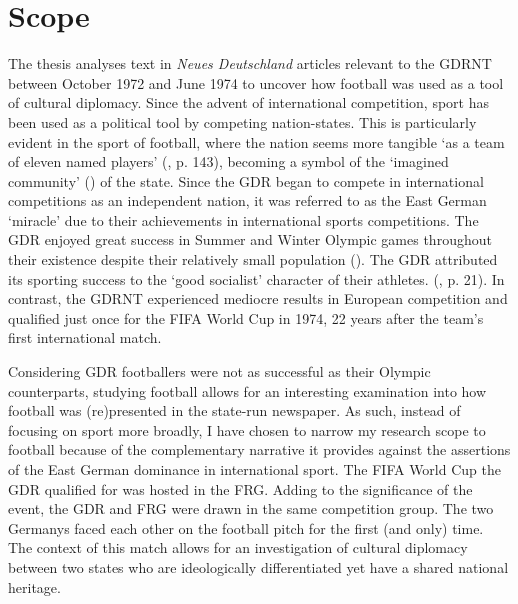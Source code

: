 \section*{Scope}

The thesis analyses text in \textit{Neues Deutschland} articles relevant to the GDRNT between October 1972 and June 1974 to uncover how football was used as a tool of cultural diplomacy. Since the advent of international competition, sport has been used as a political tool by competing nation-states. This is particularly evident in the sport of football, where the nation seems more tangible ‘as a team of eleven named players’ (\cite{hobsawm2012}, p. 143), becoming a symbol of the ‘imagined community’ (\cite{anderson1983}) of the state. Since the GDR began to compete in international competitions as an independent nation, it was referred to as the East German ‘miracle’ due to their achievements in international sports competitions. The GDR enjoyed great success in Summer and Winter Olympic games throughout their existence despite their relatively small population (\cite{dennisgrix2012}). The GDR attributed its sporting success to the ‘good socialist’ character of their athletes. (\cite{dennisgrix2012}, p. 21). In contrast, the GDRNT experienced mediocre results in European competition and qualified just once for the FIFA World Cup in 1974, 22 years after the team’s first international match.

Considering GDR footballers were not as successful as their Olympic counterparts, studying football allows for an interesting examination into how football was (re)presented in the state-run newspaper. As such, instead of focusing on sport more broadly, I have chosen to narrow my research scope to football because of the complementary narrative it provides against the assertions of the East German dominance in international sport. The FIFA World Cup the GDR qualified for was hosted in the FRG. Adding to the significance of the event, the GDR and FRG were drawn in the same competition group. The two Germanys faced each other on the football pitch for the first (and only) time. The context of this match allows for an investigation of cultural diplomacy between two states who are ideologically differentiated yet have a shared national heritage.

